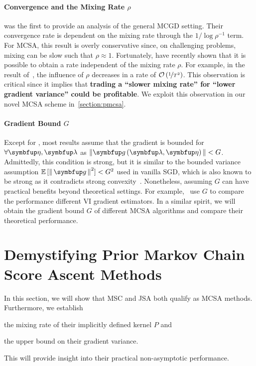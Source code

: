 \paragraph{Convergence and the Mixing Rate \(\rho\)}
\citet{duchi_ergodic_2012} was the first to provide an analysis of the general MCGD setting.
Their convergence rate is dependent on the mixing rate through the \(1 / \log \rho^{-1}\) term.
For MCSA, this result is overly conservative since, on challenging problems, mixing can be slow such that \(\rho \approx 1\).
Fortunately, \citet{doan_convergence_2020,doan_finitetime_2020} have recently shown that it is possible to obtain a rate independent of the mixing rate \(\rho\).
For example, in the result of~\citet{doan_finitetime_2020}, the influence of \(\rho\) decreases in a rate of \(\mathcal{O}\left(\nicefrac{1}{T^2}\right)\).
This observation is critical since it implies that \textbf{trading a ``slower mixing rate'' for ``lower gradient variance'' could be profitable}.
We exploit this observation in our novel MCSA scheme in~\cref{section:pmcsa}.

\vspace{-0.1in}
\paragraph{Gradient Bound \(G\)}
Except for \citet{doan_finitetime_2020}, most results assume that the gradient is bounded for \(\forall\veta,\vlambda\) as {\footnotesize\( {\| \vg\left(\vlambda, \veta\right) \|} < G \)}.
Admittedly, this condition is strong, but it is similar to the bounded variance assumption {\footnotesize\(\mathbb{E}\,[\norm{\vg}^2]  < G^2\)} used in vanilla SGD, which is also known to be strong as it contradicts strong convexity~\citep{pmlr-v80-nguyen18c}.
Nonetheless, assuming \(G\) can have practical benefits beyond theoretical settings.
For example,~\citet{pmlr-v108-geffner20a} use \(G\) to compare the performance different VI gradient estimators.
In a similar spirit, we will obtain the gradient bound \(G\) of different MCSA algorithms and compare their theoretical performance.

\vspace{-0.1in}
\section{Demystifying Prior Markov Chain Score Ascent Methods}\label{section:comparison}
\vspace{-0.1in}
In this section, we will show that MSC and JSA both qualify as MCSA methods.
Furthermore, we establish 
\begin{enumerate*}[label=\textbf{(\roman*)}]
  \item the mixing rate of their implicitly defined kernel \(P\) and
  \item the upper bound on their gradient variance.
\end{enumerate*}
This will provide insight into their practical non-asymptotic performance.

